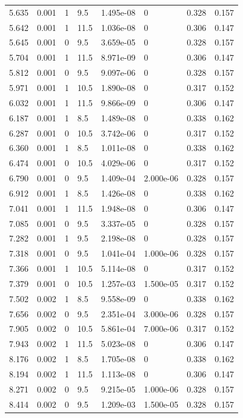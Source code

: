\documentclass[preview]{standalone}
\begin{document}
{{\begin{tabular}{L{1.2cm}C{1.2cm} C{0.3cm}C{0.5cm} C{1.4cm}C{1.4cm} C{1.4cm}C{1.4cm}}
  5.635  &  0.001  & 1     & 9.5 &  1.495e-08  & 0  & 0.328 &  0.157   \\ 
  5.642  &  0.001  & 1     & 11.5 &  1.036e-08  & 0  & 0.306 &  0.147   \\ 
  5.645  &  0.001  & 0     & 9.5 &  3.659e-05  & 0  & 0.328 &  0.157   \\ 
  5.704  &  0.001  & 1     & 11.5 &  8.971e-09  & 0  & 0.306 &  0.147   \\ 
  5.812  &  0.001  & 0     & 9.5 &  9.097e-06  & 0  & 0.328 &  0.157   \\ 
  5.971  &  0.001  & 1     & 10.5 &  1.890e-08  & 0  & 0.317 &  0.152   \\ 
  6.032  &  0.001  & 1     & 11.5 &  9.866e-09  & 0  & 0.306 &  0.147   \\ 
  6.187  &  0.001  & 1     & 8.5 &  1.489e-08  & 0  & 0.338 &  0.162   \\ 
  6.287  &  0.001  & 0     & 10.5 &  3.742e-06  & 0  & 0.317 &  0.152   \\ 
  6.360  &  0.001  & 1     & 8.5 &  1.011e-08  & 0  & 0.338 &  0.162   \\ 
  6.474  &  0.001  & 0     & 10.5 &  4.029e-06  & 0  & 0.317 &  0.152   \\ 
  6.790  &  0.001  & 0     & 9.5 &  1.409e-04  & 2.000e-06  & 0.328 &  0.157   \\ 
  6.912  &  0.001  & 1     & 8.5 &  1.426e-08  & 0  & 0.338 &  0.162   \\ 
  7.041  &  0.001  & 1     & 11.5 &  1.948e-08  & 0  & 0.306 &  0.147   \\ 
  7.085  &  0.001  & 0     & 9.5 &  3.337e-05  & 0  & 0.328 &  0.157   \\ 
  7.282  &  0.001  & 1     & 9.5 &  2.198e-08  & 0  & 0.328 &  0.157   \\ 
  7.318  &  0.001  & 0     & 9.5 &  1.041e-04  & 1.000e-06  & 0.328 &  0.157   \\ 
  7.366  &  0.001  & 1     & 10.5 &  5.114e-08  & 0  & 0.317 &  0.152   \\ 
  7.379  &  0.001  & 0     & 10.5 &  1.257e-03  & 1.500e-05  & 0.317 &  0.152   \\ 
  7.502  &  0.002  & 1     & 8.5 &  9.558e-09  & 0  & 0.338 &  0.162   \\ 
  7.656  &  0.002  & 0     & 9.5 &  2.351e-04  & 3.000e-06  & 0.328 &  0.157   \\ 
  7.905  &  0.002  & 0     & 10.5 &  5.861e-04  & 7.000e-06  & 0.317 &  0.152   \\ 
  7.943  &  0.002  & 1     & 11.5 &  5.023e-08  & 0  & 0.306 &  0.147   \\ 
  8.176  &  0.002  & 1     & 8.5 &  1.705e-08  & 0  & 0.338 &  0.162   \\ 
  8.194  &  0.002  & 1     & 11.5 &  1.113e-08  & 0  & 0.306 &  0.147   \\ 
  8.271  &  0.002  & 0     & 9.5 &  9.215e-05  & 1.000e-06  & 0.328 &  0.157   \\ 
  8.414  &  0.002  & 0     & 9.5 &  1.209e-03  & 1.500e-05  & 0.328 &  0.157   \\ 
\hline 
\end{tabular} 

}}
\end{document}
